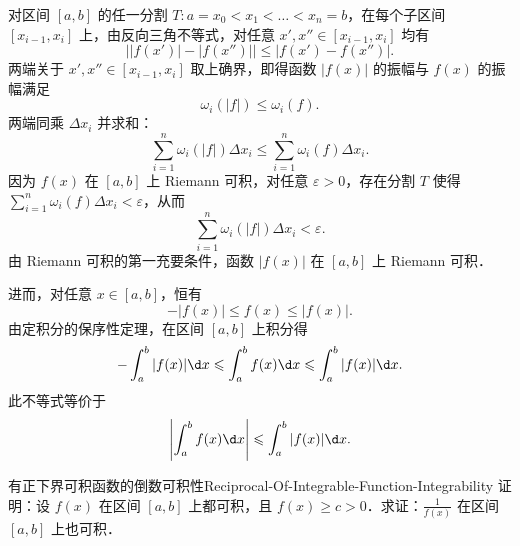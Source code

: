 \begin{myproof}
    对区间 $[a, b]$ 的任一分割 $T : a = x_0 < x_1 < \dots < x_n = b$，在每个子区间 $[x_{i-1}, x_i]$ 上，由反向三角不等式，对任意 $x', x'' \in [x_{i-1}, x_i]$ 均有
    \begin{equation}
        \bigl| |f(x')| - |f(x'')| \bigr| \leqslant |f(x') - f(x'')|.
    \end{equation}
    两端关于 $x', x'' \in [x_{i-1}, x_i]$ 取上确界，即得函数 $|f(x)|$ 的振幅与 $f(x)$ 的振幅满足
    \begin{equation}
        \omega_i(|f|) \leqslant \omega_i(f).
    \end{equation}
    两端同乘 $\Delta x_i$ 并求和：
    \begin{equation}
        \sum_{i=1}^n \omega_i(|f|) \Delta x_i \leqslant \sum_{i=1}^n \omega_i(f) \Delta x_i.
    \end{equation}
    因为 $f(x)$ 在 $[a, b]$ 上 Riemann 可积，对任意 $\varepsilon > 0$，存在分割 $T$ 使得 $\sum_{i=1}^n \omega_i(f) \Delta x_i < \varepsilon$，从而
    \begin{equation}
        \sum_{i=1}^n \omega_i(|f|) \Delta x_i < \varepsilon.
    \end{equation}
    由 Riemann 可积的第一充要条件，函数 $|f(x)|$ 在 $[a, b]$ 上 Riemann 可积．

    进而，对任意 $x \in [a, b]$，恒有
    \begin{equation}
        -|f(x)| \leqslant f(x) \leqslant |f(x)|.
    \end{equation}
    由定积分的保序性定理，在区间 $[a, b]$ 上积分得
    \begin{equation}
        -\int_a^b |f(x)| \d x \leqslant \int_a^b f(x) \d x \leqslant \int_a^b |f(x)| \d x.
    \end{equation}
    此不等式等价于
    \begin{equation}
        \left| \int_a^b f(x) \d x \right| \leqslant \int_a^b |f(x)| \d x.
    \end{equation}
\end{myproof}

\begin{problem}{有正下界可积函数的倒数可积性}{Reciprocal-Of-Integrable-Function-Integrability}
    证明：设 $f(x)$ 在区间 $[a, b]$ 上都可积，且 $f(x) \geqslant c > 0$．求证：$\frac{1}{f(x)}$ 在区间 $[a, b]$ 上也可积．
\end{problem}

